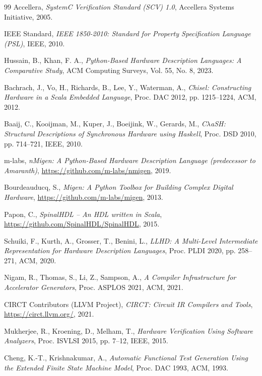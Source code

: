 ﻿\documentclass[12pt,a4paper]{report}
\begin{document}
\begin{thebibliography}{99}
  Accellera,
  \textit{SystemC Verification Standard (SCV) 1.0},
  Accellera Systems Initiative, 2005.

  IEEE Standard,
  \textit{IEEE 1850-2010: Standard for Property Specification Language (PSL)},
  IEEE, 2010.

  Hussain, B., Khan, F. A.,
  \textit{Python-Based Hardware Description Languages: A Comparative Study},
  ACM Computing Surveys, Vol. 55, No. 8, 2023.

  Bachrach, J., Vo, H., Richards, B., Lee, Y., Waterman, A.,
  \textit{Chisel: Constructing Hardware in a Scala Embedded Language},
  Proc. DAC 2012, pp. 1215--1224, ACM, 2012.

  Baaij, C., Kooijman, M., Kuper, J., Boeijink, W., Gerards, M.,
  \textit{C\ensuremath{\lambda}aSH: Structural Descriptions of Synchronous Hardware using Haskell},
  Proc. DSD 2010, pp. 714--721, IEEE, 2010.

  m-labs,
  \textit{nMigen: A Python-Based Hardware Description Language (predecessor to Amaranth)},
  \url{https://github.com/m-labs/nmigen},
  2019.

  Bourdeauducq, S.,
  \textit{Migen: A Python Toolbox for Building Complex Digital Hardware},
  \url{https://github.com/m-labs/migen},
  2013.

  Papon, C.,
  \textit{SpinalHDL -- An HDL written in Scala},
  \url{https://github.com/SpinalHDL/SpinalHDL},
  2015.

  Schuiki, F., Kurth, A., Grosser, T., Benini, L.,
  \textit{LLHD: A Multi-Level Intermediate Representation for Hardware Description Languages},
  Proc. PLDI 2020, pp. 258--271, ACM, 2020.

  Nigam, R., Thomas, S., Li, Z., Sampson, A.,
  \textit{A Compiler Infrastructure for Accelerator Generators},
  Proc. ASPLOS 2021, ACM, 2021.

  CIRCT Contributors (LLVM Project),
  \textit{CIRCT: Circuit IR Compilers and Tools},
  \url{https://circt.llvm.org/},
  2021.

  Mukherjee, R., Kroening, D., Melham, T.,
  \textit{Hardware Verification Using Software Analyzers},
  Proc. ISVLSI 2015, pp. 7--12, IEEE, 2015.

  Cheng, K.-T., Krishnakumar, A.,
  \textit{Automatic Functional Test Generation Using the Extended Finite State Machine Model},
  Proc. DAC 1993, ACM, 1993.


\end{thebibliography}
\end{document}
